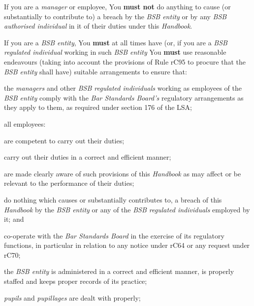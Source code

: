 If you are a \emph{manager} or employee, You \textcolor{myred}{\textbf{must not}} do anything to
cause (or substantially to contribute to) a breach by the \emph{BSB
entity} or by any \emph{BSB authorised individual} in it of their duties
under this \emph{Handbook}.


If you are a \emph{BSB entity}, You \textcolor{myred}{\textbf{must}} at all times have (or, if you
are a \emph{BSB regulated individual} working in such \emph{BSB entity}
You \textcolor{myred}{\textbf{must}} use reasonable endeavours (taking into account the provisions
of Rule rC95 to procure that the \emph{BSB entity} shall have) suitable
arrangements to ensure that:
\begin{numlist}
\item the \emph{managers} and other \emph{BSB regulated individuals}
working as employees of the \emph{BSB entity} comply with the \emph{Bar
Standards Board's} regulatory arrangements as they apply to them, as
required under section 176 of the LSA;

\item all employees:
\begin{alphlist}
\item are competent to carry out their duties;

\item carry out their duties in a correct and efficient manner;

\item are made clearly aware of such provisions of this \emph{Handbook} as
may affect or be relevant to the performance of their duties;

\item do nothing which causes or substantially contributes to, a breach of
this \emph{Handbook} by the \emph{BSB entity} or any of the \emph{BSB
regulated individuals} employed by it; and

\item co-operate with the \emph{Bar Standards Board} in the exercise of its
regulatory functions, in particular in relation to any notice under rC64
or any request under rC70;
\end{alphlist}
\item the \emph{BSB entity} is administered in a correct and efficient
manner, is properly staffed and keeps proper records of its practice;

\item \emph{pupils} and \emph{pupillages} are dealt with properly;


\end{numlist}
